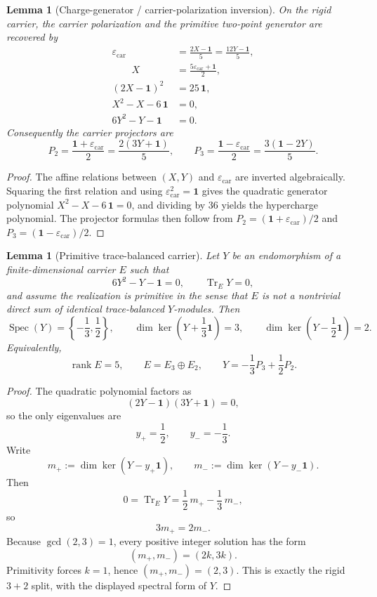 \documentclass[11pt,a4paper]{article}
\newtheorem{lemma}[theorem]{Lemma}
\theoremstyle{definition}
\theoremstyle{remark}
\DeclareMathOperator{\tr}{Tr}
\DeclareMathOperator{\rank}{rank}
\newcommand{\epscar}{\varepsilon_{\mathrm{car}}}
\begin{document}
\begin{lemma}[Charge-generator / carrier-polarization inversion]
On the rigid carrier, the carrier polarization and the primitive two-point generator are recovered by
\begin{align}
\epscar&=\frac{2X-\mathbf 1}{5}=\frac{12Y-\mathbf 1}{5},
\label{eq:hypercharge-seam-inversion}\\
\qquad
X&=\frac{5\epscar+\mathbf 1}{2},
\nonumber\\
(2X-\mathbf 1)^2&=25\,\mathbf 1,
\nonumber\\
X^2-X-6\,\mathbf 1&=0,
\nonumber\\
6Y^2-Y-\mathbf 1&=0.
\label{eq:carrier-polynomial}
\end{align}
Consequently the carrier projectors are
\[
P_2=\frac{\mathbf 1+\epscar}{2}=\frac{2(3Y+\mathbf 1)}{5},
\qquad
P_3=\frac{\mathbf 1-\epscar}{2}=\frac{3(\mathbf 1-2Y)}{5}.
\]
\end{lemma}

\begin{proof}
The affine relations between $(X,Y)$ and $\epscar$ are inverted algebraically. Squaring the first
relation and using $\epscar^2=\mathbf 1$ gives the quadratic generator polynomial
$X^2-X-6\,\mathbf 1=0$, and dividing by $36$ yields the hypercharge polynomial. The projector
formulas then follow from $P_2=(\mathbf 1+\epscar)/2$ and $P_3=(\mathbf 1-\epscar)/2$.
\end{proof}

\begin{lemma}[Primitive trace-balanced carrier]
\label{lem:primitive-trace-balanced-carrier}
Let $Y$ be an endomorphism of a finite-dimensional carrier $E$ such that
\[
6Y^2-Y-\mathbf 1=0,
\qquad
\tr_EY=0,
\]
and assume the realization is primitive in the sense that $E$ is not a nontrivial direct sum of
identical trace-balanced $Y$-modules. Then
\[
\operatorname{Spec}(Y)=\left\{-\frac13,\frac12\right\},
\qquad
\dim\ker\!\left(Y+\frac13\mathbf 1\right)=3,
\qquad
\dim\ker\!\left(Y-\frac12\mathbf 1\right)=2.
\]
Equivalently,
\[
\rank E=5,
\qquad
E=E_3\oplus E_2,
\qquad
Y=-\frac13P_3+\frac12P_2.
\]
\end{lemma}

\begin{proof}
The quadratic polynomial factors as
\[
(2Y-\mathbf 1)(3Y+\mathbf 1)=0,
\]
so the only eigenvalues are
\[
y_+=\frac12,
\qquad
y_-=-\frac13.
\]
Write
\[
m_+:=\dim\ker(Y-y_+\mathbf 1),
\qquad
m_-:=\dim\ker(Y-y_-\mathbf 1).
\]
Then
\[
0=\tr_EY=\frac12\,m_+-\frac13\,m_-,
\]
so
\[
3m_+=2m_-.
\]
Because $\gcd(2,3)=1$, every positive integer solution has the form
\[
(m_+,m_-)=(2k,3k).
\]
Primitivity forces $k=1$, hence $(m_+,m_-)=(2,3)$. This is exactly the rigid $3+2$ split, with
the displayed spectral form of $Y$.
\end{proof}
\end{document}
